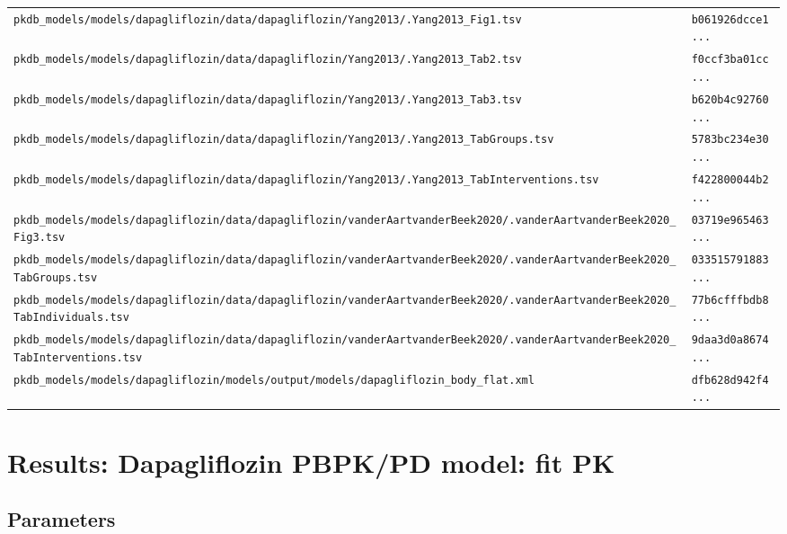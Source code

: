 \begin{longtable}{ll}
\texttt{pkdb\_models/models/dapagliflozin/data/dapagliflozin/Yang2013/.Yang2013\_Fig1.tsv} & \texttt{b061926dcce1...} \\
\texttt{pkdb\_models/models/dapagliflozin/data/dapagliflozin/Yang2013/.Yang2013\_Tab2.tsv} & \texttt{f0ccf3ba01cc...} \\
\texttt{pkdb\_models/models/dapagliflozin/data/dapagliflozin/Yang2013/.Yang2013\_Tab3.tsv} & \texttt{b620b4c92760...} \\
\texttt{pkdb\_models/models/dapagliflozin/data/dapagliflozin/Yang2013/.Yang2013\_TabGroups.tsv} & \texttt{5783bc234e30...} \\
\texttt{pkdb\_models/models/dapagliflozin/data/dapagliflozin/Yang2013/.Yang2013\_TabInterventions.tsv} & \texttt{f422800044b2...} \\
\texttt{pkdb\_models/models/dapagliflozin/data/dapagliflozin/vanderAartvanderBeek2020/.vanderAartvanderBeek2020\_Fig3.tsv} & \texttt{03719e965463...} \\
\texttt{pkdb\_models/models/dapagliflozin/data/dapagliflozin/vanderAartvanderBeek2020/.vanderAartvanderBeek2020\_TabGroups.tsv} & \texttt{033515791883...} \\
\texttt{pkdb\_models/models/dapagliflozin/data/dapagliflozin/vanderAartvanderBeek2020/.vanderAartvanderBeek2020\_TabIndividuals.tsv} & \texttt{77b6cfffbdb8...} \\
\texttt{pkdb\_models/models/dapagliflozin/data/dapagliflozin/vanderAartvanderBeek2020/.vanderAartvanderBeek2020\_TabInterventions.tsv} & \texttt{9daa3d0a8674...} \\
\texttt{pkdb\_models/models/dapagliflozin/models/output/models/dapagliflozin\_body\_flat.xml} & \texttt{dfb628d942f4...} \\
\end{longtable}

\section{Results: Dapagliflozin PBPK/PD model: fit PK}

\subsection{Parameters}

